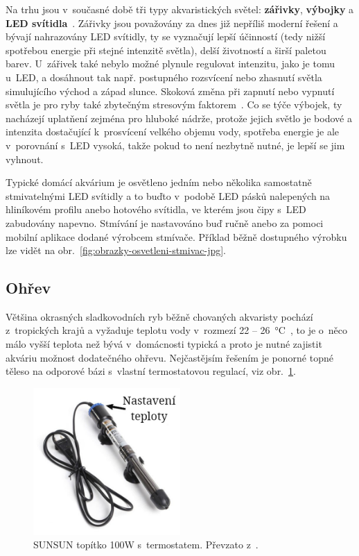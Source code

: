         Na trhu jsou v~současné době tři typy akvaristických světel: \textbf{zářivky}, \textbf{výbojky}  a \textbf{LED svítidla}~\cite{eshop-rostlinna-akvaria-svetlo}. Zářivky jsou považovány za dnes již nepříliš moderní řešení a bývají nahrazovány LED svítidly, ty se vyznačují lepší účinností (tedy nižší spotřebou energie při stejné intenzitě světla), delší životností a širší paletou barev. U~zářivek také nebylo možné plynule regulovat intenzitu, jako je tomu u~LED, a dosáhnout tak např. postupného rozsvícení nebo zhasnutí světla simulujícího východ a západ slunce. Skoková změna při zapnutí nebo vypnutí světla je pro ryby také zbytečným stresovým faktorem~\cite{MusilLibor2018Isps}. Co se týče výbojek, ty nacházejí uplatňení zejména pro hluboké nádrže, protože jejich světlo je bodové a intenzita dostačující k~prosvícení velkého objemu vody, spotřeba energie je ale v~porovnání s~LED vysoká, takže pokud to není nezbytně nutné, je lepší se jim vyhnout.   

        Typické domácí akvárium je osvětleno jedním nebo několika samostatně stmivatelnými LED svítidly a to buďto v~podobě LED pásků nalepených na hliníkovém profilu anebo hotového svítidla, ve kterém jsou čipy s~LED zabudovány napevno. Stmívání je nastavováno buď ručně anebo za pomoci mobilní aplikace dodané výrobcem stmívače. Příklad běžně dostupného výrobku lze vidět na obr.~\ref{fig:obrazky-osvetleni-stmivac-jpg}.

    \subsection{Ohřev}
        Většina okrasných sladkovodních ryb běžně chovaných akvaristy pochází z~tropických krajů a vyžaduje teplotu vody v~rozmezí 22 -- \qty{26}{\degreeCelsius}~\cite{slavotinek2014}, to je o~něco málo vyšší teplota než bývá v~domácnosti typická a proto je nutné zajistit akváriu možnost dodatečného ohřevu. Nejčastějsím řešením je ponorné topné těleso na odporové bázi s~vlastní termostatovou regulací, viz obr.~\ref{fig:obrazky-topeni-topitko-jpg}.

        \begin{figure}[h!]
            \centering
            \includegraphics[width=0.5\textwidth]{obrazky/topeni/topitko.jpg}
            \caption{SUNSUN topítko 100W s~termostatem. Převzato z~\cite{eshop-rostlinna-akvaria}.}
            \label{fig:obrazky-topeni-topitko-jpg}
        \end{figure}
        
